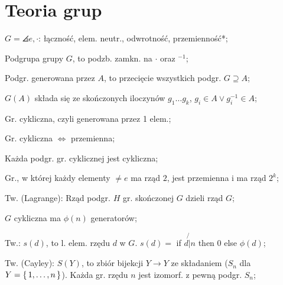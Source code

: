 \section{Teoria grup}

$G = \angles{e, \cdot}$: łączność, elem. neutr., odwrotność, przemienność*;

Podgrupa grupy $G$, to podzb. zamkn. na $\cdot$ oraz $^{-1}$;

Podgr. generowana przez $A$, to przecięcie wszystkich podgr. $G \supseteq A$;

$G(A)$ składa się ze skończonych iloczynów $g_1\dots g_k$,
  $g_i\in A \lor g_i^{-1} \in A$;

Gr. cykliczna, czyli generowana przez 1 elem.;

Gr. cykliczna $\Leftrightarrow$ przemienna;

Każda podgr. gr. cyklicznej jest cykliczna;

Gr., w której każdy elementy $\neq e$ ma rząd $2$, jest przemienna i ma rząd $2^k$;

Tw. (Lagrange): Rząd podgr. $H$ gr. skończonej $G$ dzieli rząd $G$;

$G$ cykliczna ma $\phi(n)$ generatorów;

Tw.: $s(d)$, to l. elem. rzędu $d$ w $G$. $s(d) =$ if $d \not{|} n$ then $0$
  else $\phi(d)$;

Tw. (Cayley): $S(Y)$, to zbiór bijekcji $Y \rightarrow Y$ ze składaniem
  ($S_n$ dla $Y=\set{1,\dots,n}$). Każda gr. rzędu $n$ jest izomorf. z pewną
  podgr.  $S_n$;

